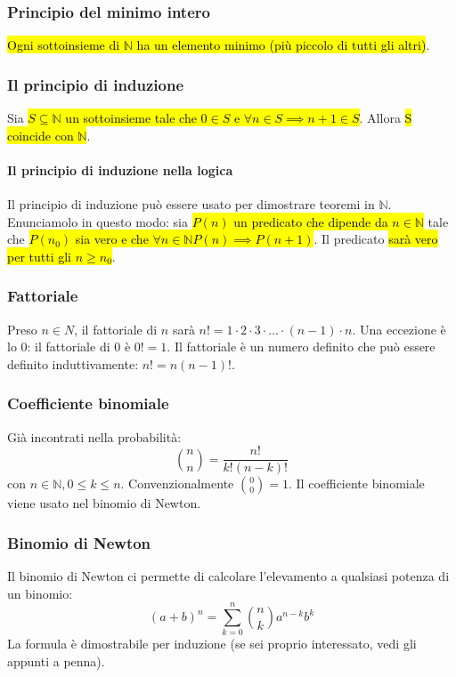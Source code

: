 \subsubsection{Principio del minimo intero} 
\hl{Ogni sottoinsieme di $\mathbb{N}$ ha un elemento minimo (più piccolo di 
tutti gli altri)}.

\subsubsection{Il principio di induzione} 
Sia \hl{$S \subseteq \mathbb{N}$ un sottoinsieme tale che 
$0 \in S$ e $\forall n \in S \implies n+1 \in S$}. Allora 
\hl{S coincide con $\mathbb{N}$}.

\paragraph{Il principio di induzione nella logica} Il principio di induzione 
può essere usato per dimostrare teoremi in $\mathbb{N}$. Enunciamolo in questo 
modo: sia \hl{$P(n)$ un predicato che dipende da $n \in \mathbb{N}$} tale che
\hl{$P(n_0)$ sia vero e che $\forall n \in \mathbb{N} P(n) \implies P(n+1)$}. Il
predicato \hl{sarà vero per tutti gli $n \geq n_0$}.

\subsubsection{Fattoriale} 
Preso $n \in N$, il fattoriale di $n$ sarà
$n! = 1 \cdot 2 \cdot 3 \cdot \ldots \cdot (n-1) \cdot n$. Una eccezione è lo 0:
il fattoriale di 0 è $0! = 1$. Il fattoriale è un numero definito che può essere
definito induttivamente: $n! = n(n-1)!$.

\subsubsection{Coefficiente binomiale} 
Già incontrati nella probabilità:
\[ \binom{n}{n} = \frac{n!}{k!(n-k)!} \]
con $n \in \mathbb{N}, 0 \leq k \leq n$. Convenzionalmente $\binom{0}{0} = 1$. 
Il coefficiente binomiale viene usato nel binomio di Newton.

\subsubsection{Binomio di Newton} 
Il binomio di Newton ci permette di calcolare l'elevamento a qualsiasi potenza 
di un binomio:
\[ (a+b)^n = \sum_{k=0}^n \binom{n}{k} a^{n-k} b^k \]
La formula è dimostrabile per induzione (se sei proprio interessato, vedi gli
appunti a penna).

